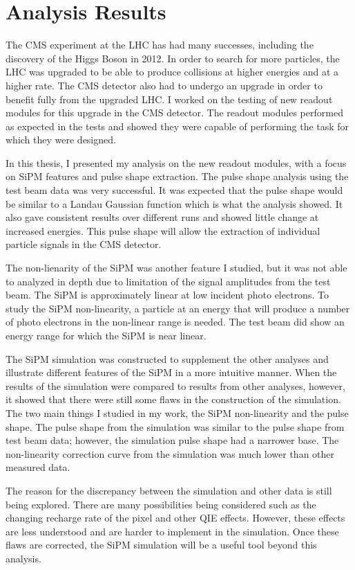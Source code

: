\section{Analysis Results}

The CMS experiment at the LHC has had many successes, including the discovery of the Higgs Boson in 2012. In order to search for more particles, the LHC was upgraded to be able to produce collisions at higher energies and at a higher rate. The CMS detector also had to undergo an upgrade in order to benefit fully from the upgraded LHC. I worked on the testing of new readout modules for this upgrade in the CMS detector. The readout modules performed as expected in the tests and showed they were capable of performing the task for which they were designed. 

In this thesis, I presented my analysis on the new readout modules, with a focus on SiPM features and pulse shape extraction. The pulse shape analysis using the test beam data was very successful. It was expected that the pulse shape would be similar to a Landau Gaussian function which is what the analysis showed. It also gave consistent results over different runs and showed little change at increased energies. This pulse shape will allow the extraction of individual particle signals in the CMS detector. 

The non-lienarity of the SiPM was another feature I studied, but it was not able to analyzed in depth due to limitation of the signal amplitudes from the test beam. The SiPM is approximately linear at low incident photo electrons. To study the SiPM non-linearity, a particle at an energy that will produce a number of photo electrons in the non-linear range is needed. The test beam did show an energy range for which the SiPM is near linear.

The SiPM simulation was constructed to supplement the other analyses and illustrate different features of the SiPM in a more intuitive manner. When the results of the simulation were compared to results from other analyses, however, it showed that there were still some flaws in the construction of the simulation. The two main things I studied in my work, the SiPM non-linearity and the pulse shape. The pulse shape from the simulation was similar to the pulse shape from test beam data; however, the simulation pulse shape had a narrower base. The non-linearity correction curve from the simulation was much lower than other measured data.

The reason for the discrepancy between the simulation and other data is still being explored. There are many possibilities being considered such as the changing recharge rate of the pixel and other QIE effects. However, these effects are less understood and are harder to implement in the simulation. Once these flaws are corrected, the SiPM simulation will be a useful tool beyond this analysis. 

